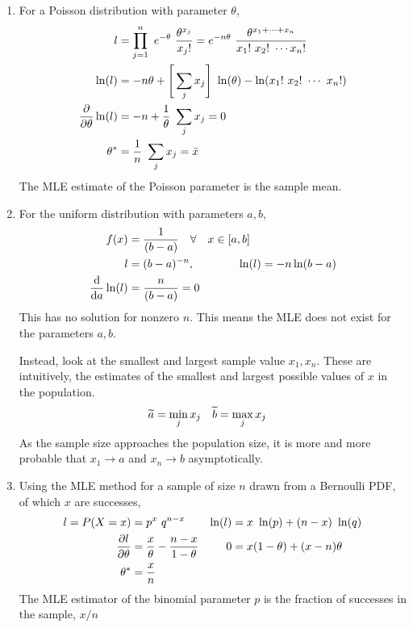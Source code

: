 \begin{enumerate}
    \item For a Poisson distribution with parameter $ \theta $,
          \begin{align}
              l        & = \prod_{j=1}^{n}\ e^{-\theta}\ \frac{\theta^{x_j}}{x_j!}
              = e^{-n\theta}\ \frac{\theta^{x_1 + \dots + x_n}}
              {x_1!\ x_2!\ \cdots x_n!}                                            \\
              \ln(l)   & = -n\theta + \Bigg[\sum_j x_j\Bigg]\ \ln(\theta) -
              \ln(x_1!\ x_2!\ \cdots\ x_n!)                                        \\
              \diffp* {\ln(l)}{\theta}
                       & = -n + \frac{1}{\theta}\ \sum_j x_j = 0                   \\
              \theta^* & = \frac{1}{n}\ \sum_j x_j = \bar{x}
          \end{align}
          The MLE estimate of the Poisson parameter is the sample mean.

    \item For the uniform distribution with parameters $ a,b $,
          \begin{align}
              f(x)               & = \frac{1}{(b-a)} \quad \forall \quad x \in [a,b] \\
              l                  & = (b-a)^{-n}, \qquad\qquad \ln(l) = -n\ln(b-a)    \\
              \diff* {\ln(l)}{a} & = \frac{n}{(b-a)} = 0
          \end{align}
          This has no solution for nonzero $ n $. This means the MLE does not exist for
          the parameters $ a,b $.
          \par Instead, look at the smallest and largest sample value $ x_1, x_n $. These
          are intuitively, the estimates of the smallest and largest possible values of
          $ x $ in the population.
          \begin{align}
              \widetilde{a} & = \min_j{x_j} & \widetilde{b} & = \max_j {x_j}
          \end{align}
          As the sample size approaches the population size, it is more and more
          probable that $ x_1 \to a $ and $ x_n \to b $ asymptotically.

    \item Using the MLE method for a sample of size $ n $ drawn from a Bernoulli PDF,
          of which $ x $ are successes,
          \begin{align}
              l = P(X = x)         & = p^x\ q^{n-x}               &
              \ln(l)               & = x\ \ln(p) + (n-x)\ \ln(q)    \\
              \diffp{l}{\theta}    & = \frac{x}{\theta} -
              \frac{n-x}{1-\theta} &
              0                    & = x(1- \theta) + (x-n)\theta   \\
              \theta^*             & = \frac{x}{n}
          \end{align}
          The MLE estimator of the binomial parameter $ p $ is the fraction of successes
          in the sample, $ x/n $


\end{enumerate}
